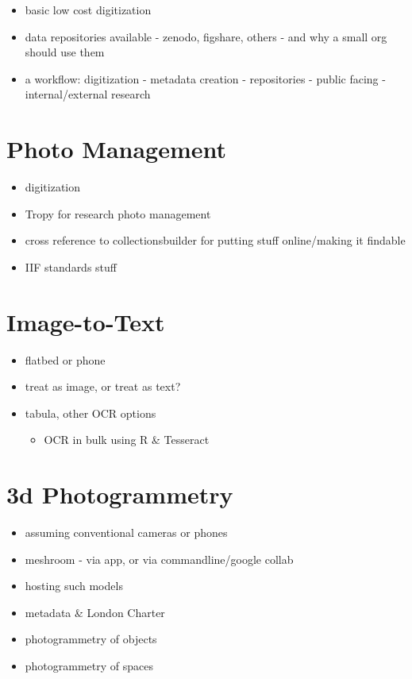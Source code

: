 \documentclass[
]{book}
\providecommand{\tightlist}{%
  \setlength{\itemsep}{0pt}\setlength{\parskip}{0pt}}
\begin{document}
\begin{itemize}
\tightlist
\item
  basic low cost digitization
\item
  data repositories available - zenodo, figshare, others - and why a small org should use them
\item
  a workflow: digitization - metadata creation - repositories - public facing - internal/external research
\end{itemize}

\hypertarget{photos}{%
\section{Photo Management}\label{photos}}

\begin{itemize}
\tightlist
\item
  digitization
\item
  Tropy for research photo management
\item
  cross reference to collectionsbuilder for putting stuff online/making it findable
\item
  IIF standards stuff
\end{itemize}

\hypertarget{scanning}{%
\section{Image-to-Text}\label{scanning}}

\begin{itemize}
\tightlist
\item
  flatbed or phone
\item
  treat as image, or treat as text?
\item
  tabula, other OCR options

  \begin{itemize}
  \tightlist
  \item
    OCR in bulk using R \& Tesseract
  \end{itemize}
\end{itemize}

\hypertarget{photogrammetry}{%
\section{3d Photogrammetry}\label{photogrammetry}}

\begin{itemize}
\tightlist
\item
  assuming conventional cameras or phones
\item
  meshroom - via app, or via commandline/google collab
\item
  hosting such models
\item
  metadata \& London Charter
\item
  photogrammetry of objects
\item
  photogrammetry of spaces
\end{itemize}
\end{document}
